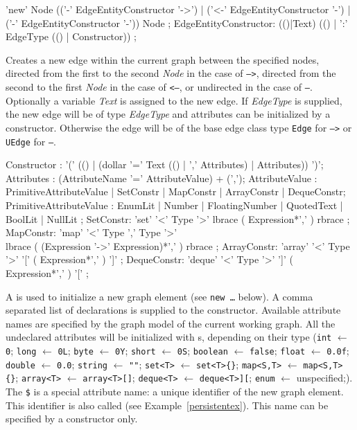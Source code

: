 \begin{rail}
  'new' Node (('-' EdgeEntityConstructor '->') | ('<-' EdgeEntityConstructor '-') | ('-' EdgeEntityConstructor '-')) Node ;
EdgeEntityConstructor:
  (()|Text) (() | ':' EdgeType (() | Constructor)) ;
\end{rail}
Creates a new edge within the current graph between the specified nodes,
directed from the first to the second \emph{Node} in the case of \texttt{-->},
directed from the second to the first \emph{Node} in the case of \texttt{<--},
or undirected in the case of \texttt{--}.
Optionally a variable \emph{Text} is assigned to the new edge.
If \emph{EdgeType} is supplied, the new edge will be of type \emph{EdgeType} and attributes can be initialized by a constructor.
Otherwise the edge will be of the base edge class type \texttt{Edge} for \texttt{-->} or \texttt{UEdge} for \texttt{--}.

\begin{rail}
  Constructor : '(' (() | (dollar '=' Text (() | ',' Attributes) | Attributes)) ')';
  Attributes : (AttributeName '=' AttributeValue) + (',');
  AttributeValue :  PrimitiveAttributeValue | SetConstr | MapConstr | ArrayConstr | DequeConstr;
  PrimitiveAttributeValue : EnumLit | Number | FloatingNumber | QuotedText | BoolLit | NullLit ;
  SetConstr: 'set' '<' Type '>' lbrace ( Expression*',' ) rbrace ;
  MapConstr: 'map' '<' Type ',' Type '>' \\ lbrace ( (Expression '->' Expression)*',' ) rbrace ;
  ArrayConstr: 'array' '<' Type '>' '[' ( Expression*',' ) ']' ;
  DequeConstr: 'deque' '<' Type '>' ']' ( Expression*',' ) '[' ;
\end{rail}\indexmain{\texttt{\$}}
A  is used to initialize a new graph element (see \texttt{new \dots} below).
A comma separated list of  declarations is supplied to the constructor.
Available attribute names are specified by the graph model of the current working graph.
All the undeclared attributes will be initialized with s, depending on their type
(\texttt{int} $\leftarrow$ \texttt{0}; \texttt{long} $\leftarrow$ \texttt{0L}; \texttt{byte} $\leftarrow$ \texttt{0Y}; \texttt{short} $\leftarrow$ \texttt{0S}; \texttt{boolean} $\leftarrow$ \texttt{false}; \texttt{float} $\leftarrow$ \texttt{0.0f}; \texttt{double} $\leftarrow$ \texttt{0.0}; \texttt{string} $\leftarrow$ \texttt{""}; \texttt{set<T>} $\leftarrow$ \texttt{set<T>\{\}}; \texttt{map<S,T>} $\leftarrow$ \texttt{map<S,T>\{\}}; \texttt{array<T>} $\leftarrow$ \texttt{array<T>[]}; \texttt{deque<T>} $\leftarrow$ \texttt{deque<T>][}; \texttt{enum} $\leftarrow$ unspecified;).\\
The \texttt{\$} is a special attribute name: a unique identifier of the new graph element.
This identifier is also called  (see Example~\ref{persistentex}).
This name can be specified by a constructor only.

